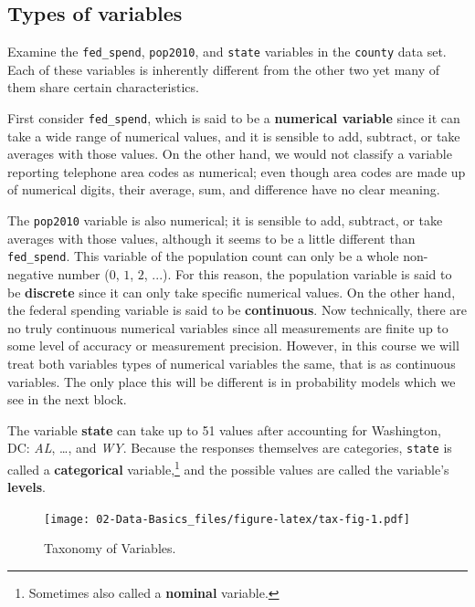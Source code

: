 \documentclass[
]{book}
\begin{document}
\hypertarget{types-of-variables}{%
\subsection{Types of variables}\label{types-of-variables}}

Examine the \texttt{fed\_spend}, \texttt{pop2010}, and \texttt{state} variables in the \texttt{county} data set. Each of these variables is inherently different from the other two yet many of them share certain characteristics.

First consider \texttt{fed\_spend}, which is said to be a \textbf{numerical variable} since it can take a wide range of numerical values, and it is sensible to add, subtract, or take averages with those values. On the other hand, we would not classify a variable reporting telephone area codes as numerical; even though area codes are made up of numerical digits, their average, sum, and difference have no clear meaning.

The \texttt{pop2010} variable is also numerical; it is sensible to add, subtract, or take averages with those values, although it seems to be a little different than \texttt{fed\_spend}. This variable of the population count can only be a whole non-negative number (\(0\), \(1\), \(2\), \(...\)). For this reason, the population variable is said to be \textbf{discrete} since it can only take specific numerical values. On the other hand, the federal spending variable is said to be \textbf{continuous}. Now technically, there are no truly continuous numerical variables since all measurements are finite up to some level of accuracy or measurement precision. However, in this course we will treat both variables types of numerical variables the same, that is as continuous variables. The only place this will be different is in probability models which we see in the next block.

The variable \textbf{state} can take up to 51 values after accounting for Washington, DC: \emph{AL}, \ldots, and \emph{WY}. Because the responses themselves are categories, \texttt{state} is called a \textbf{categorical} variable,\footnote{Sometimes also called a \textbf{nominal} variable.} and the possible values are called the variable's \textbf{levels}.

\begin{figure}
\centering
\texttt{[image: 02-Data-Basics\_files/figure-latex/tax-fig-1.pdf]}
\caption{\label{fig:tax-fig}Taxonomy of Variables.}
\end{figure}
\end{document}
